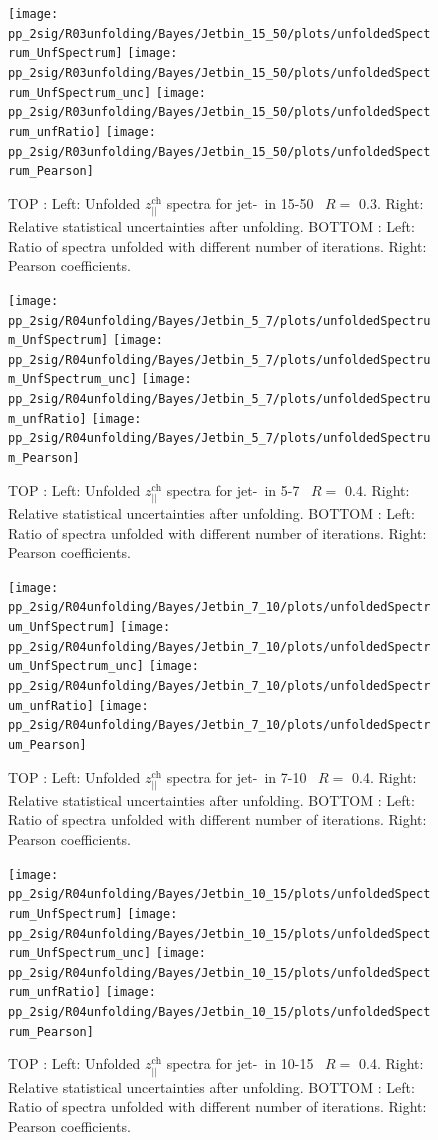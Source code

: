 \begin{figure}[bth]
\centering
\texttt{[image: pp\_2sig/R03unfolding/Bayes/Jetbin\_15\_50/plots/unfoldedSpectrum\_UnfSpectrum]}
\texttt{[image: pp\_2sig/R03unfolding/Bayes/Jetbin\_15\_50/plots/unfoldedSpectrum\_UnfSpectrum\_unc]}
\texttt{[image: pp\_2sig/R03unfolding/Bayes/Jetbin\_15\_50/plots/unfoldedSpectrum\_unfRatio]}
\texttt{[image: pp\_2sig/R03unfolding/Bayes/Jetbin\_15\_50/plots/unfoldedSpectrum\_Pearson]}
\caption{TOP : Left: Unfolded $z_{||}^\text{ch}$ spectra for jet-\pt\ in 15-50 \GeVc\, $R=$ 0.3. Right: Relative statistical uncertainties after unfolding.
BOTTOM : Left: Ratio of spectra unfolded with different number of iterations. Right: Pearson coefficients.
}
\label{fig:unf_R03_15_50}
\end{figure}
\begin{figure}[bth]
\centering
\texttt{[image: pp\_2sig/R04unfolding/Bayes/Jetbin\_5\_7/plots/unfoldedSpectrum\_UnfSpectrum]}
\texttt{[image: pp\_2sig/R04unfolding/Bayes/Jetbin\_5\_7/plots/unfoldedSpectrum\_UnfSpectrum\_unc]}
\texttt{[image: pp\_2sig/R04unfolding/Bayes/Jetbin\_5\_7/plots/unfoldedSpectrum\_unfRatio]}
\texttt{[image: pp\_2sig/R04unfolding/Bayes/Jetbin\_5\_7/plots/unfoldedSpectrum\_Pearson]}
\caption{TOP : Left: Unfolded $z_{||}^\text{ch}$ spectra for jet-\pt\ in 5-7 \GeVc\, $R=$ 0.4. Right: Relative statistical uncertainties after unfolding.
BOTTOM : Left: Ratio of spectra unfolded with different number of iterations. Right: Pearson coefficients.
}
\label{fig:unf_R04_5_7}
\end{figure}


\begin{figure}[bth]
\centering
\texttt{[image: pp\_2sig/R04unfolding/Bayes/Jetbin\_7\_10/plots/unfoldedSpectrum\_UnfSpectrum]}
\texttt{[image: pp\_2sig/R04unfolding/Bayes/Jetbin\_7\_10/plots/unfoldedSpectrum\_UnfSpectrum\_unc]}
\texttt{[image: pp\_2sig/R04unfolding/Bayes/Jetbin\_7\_10/plots/unfoldedSpectrum\_unfRatio]}
\texttt{[image: pp\_2sig/R04unfolding/Bayes/Jetbin\_7\_10/plots/unfoldedSpectrum\_Pearson]}
\caption{TOP : Left: Unfolded $z_{||}^\text{ch}$ spectra for jet-\pt\ in 7-10 \GeVc\, $R=$ 0.4. Right: Relative statistical uncertainties after unfolding.
BOTTOM : Left: Ratio of spectra unfolded with different number of iterations. Right: Pearson coefficients.
}
\label{fig:unf_R04_7_10}
\end{figure}

\begin{figure}[bth]
\centering
\texttt{[image: pp\_2sig/R04unfolding/Bayes/Jetbin\_10\_15/plots/unfoldedSpectrum\_UnfSpectrum]}
\texttt{[image: pp\_2sig/R04unfolding/Bayes/Jetbin\_10\_15/plots/unfoldedSpectrum\_UnfSpectrum\_unc]}
\texttt{[image: pp\_2sig/R04unfolding/Bayes/Jetbin\_10\_15/plots/unfoldedSpectrum\_unfRatio]}
\texttt{[image: pp\_2sig/R04unfolding/Bayes/Jetbin\_10\_15/plots/unfoldedSpectrum\_Pearson]}
\caption{TOP : Left: Unfolded $z_{||}^\text{ch}$ spectra for jet-\pt\ in 10-15 \GeVc\, $R=$ 0.4. Right: Relative statistical uncertainties after unfolding.
BOTTOM : Left: Ratio of spectra unfolded with different number of iterations. Right: Pearson coefficients.
}
\label{fig:unf_R04_10_15}
\end{figure}

